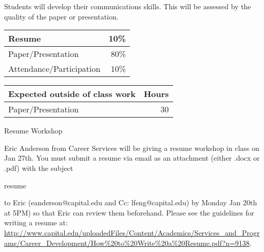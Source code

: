 \documentclass[11pt]{article}
\begin{document}
\item
Students will develop their communications skills. This will be assessed by the quality of the paper or presentation. 

\SyllabusEndOutcomes{}




\SyllabusAssignments{}

\SyllabusWebPage{}

\flushleft
\begin{tabular}[t]{|l|r|}
\hline
Resume & 10\%\\\hline
Paper/Presentation & 80\%\\\hline
Attendance/Participation & 10\%\\\hline
\end{tabular}%
\hspace{0.1in}%
\begin{tabular}[t]{|l|r|}
\hline
Expected outside of class work & Hours\\\hline\hline
Paper/Presentation & 30\\\hline
\end{tabular}

\newpage

\SyllabusGradingScale

\flushleft
\begin{bfseries}Resume Workshop\end{bfseries}


Eric Anderson from Career Services will be giving a resume workshop in class on Jan 27th. You must submit a resume via email as an attachment (either .docx or .pdf) with the subject \begin{bfseries}resume\end{bfseries} to Eric (eanderson@capital.edu and Cc: lfeng@capital.edu) by Monday Jan 20th at 5PM) so that Eric can review them beforehand. Please see the guidelines for writing a resume at: \url{http://www.capital.edu/uploadedFiles/Content/Academics/Services_and_Programs/Career_Development/How\%20to\%20Write\%20a\%20Resume.pdf?n=9138}. \\
\end{document}
